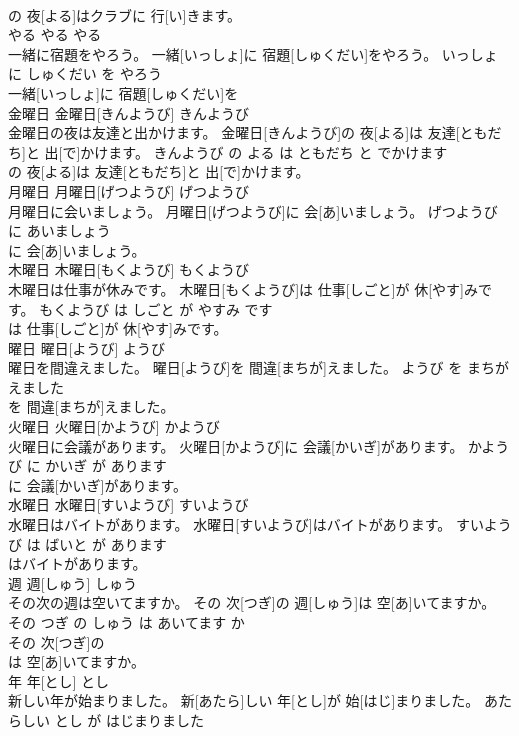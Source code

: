 \documentclass[8pt]{extreport}
\begin{document}
\begin{CJK}{UTF8}{min}
\\	の 夜[よる]はクラブに 行[い]きます。			
\\	やる	やる	やる	
\\	一緒に宿題をやろう。	一緒[いっしょ]に 宿題[しゅくだい]をやろう。	いっしょ に しゅくだい を やろう	
\\	一緒[いっしょ]に 宿題[しゅくだい]を
\\	金曜日	金曜日[きんようび]	きんようび	
\\	金曜日の夜は友達と出かけます。	金曜日[きんようび]の 夜[よる]は 友達[ともだち]と 出[で]かけます。	きんようび の よる は ともだち と でかけます	
\\	の 夜[よる]は 友達[ともだち]と 出[で]かけます。			
\\	月曜日	月曜日[げつようび]	げつようび	
\\	月曜日に会いましょう。	月曜日[げつようび]に 会[あ]いましょう。	げつようび に あいましょう	
\\	に 会[あ]いましょう。			
\\	木曜日	木曜日[もくようび]	もくようび	
\\	木曜日は仕事が休みです。	木曜日[もくようび]は 仕事[しごと]が 休[やす]みです。	もくようび は しごと が やすみ です	
\\	は 仕事[しごと]が 休[やす]みです。			
\\	曜日	曜日[ようび]	ようび	
\\	曜日を間違えました。	曜日[ようび]を 間違[まちが]えました。	ようび を まちがえました	
\\	を 間違[まちが]えました。			
\\	火曜日	火曜日[かようび]	かようび	
\\	火曜日に会議があります。	火曜日[かようび]に 会議[かいぎ]があります。	かようび に かいぎ が あります	
\\	に 会議[かいぎ]があります。			
\\	水曜日	水曜日[すいようび]	すいようび	
\\	水曜日はバイトがあります。	水曜日[すいようび]はバイトがあります。	すいようび は ばいと が あります	
\\	はバイトがあります。			
\\	週	週[しゅう]	しゅう	
\\	その次の週は空いてますか。	その 次[つぎ]の 週[しゅう]は 空[あ]いてますか。	その つぎ の しゅう は あいてます か	
\\	その 次[つぎ]の
\\	は 空[あ]いてますか。			
\\	年	年[とし]	とし	
\\	新しい年が始まりました。	新[あたら]しい 年[とし]が 始[はじ]まりました。	あたらしい とし が はじまりました	

\end{CJK}
\end{document}
